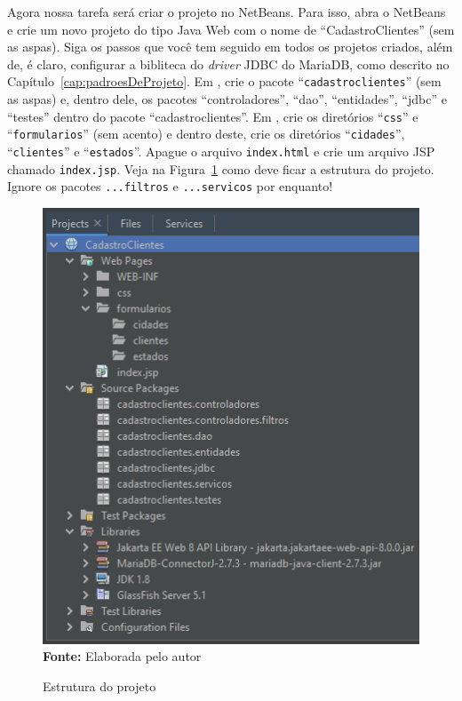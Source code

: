 Agora nossa tarefa será criar o projeto no NetBeans. Para isso, abra o NetBeans e crie um novo projeto do tipo Java Web com o nome de ``CadastroClientes'' (sem as aspas). Siga os passos que você tem seguido em todos os projetos criados, além de, é claro, configurar a bibliteca do \textit{driver} JDBC do MariaDB, como descrito no Capítulo~\ref{cap:padroesDeProjeto}. Em , crie o pacote ``\texttt{cadastroclientes}'' (sem as aspas) e, dentro dele, os pacotes ``controladores'', ``dao'', ``entidades'', ``jdbc'' e ``testes'' dentro do pacote ``cadastroclientes''. Em , crie os diretórios ``\texttt{css}'' e ``\texttt{formularios}'' (sem acento) e dentro deste, crie os diretórios ``\texttt{cidades}'', ``\texttt{clientes}'' e ``\texttt{estados}''. Apague o arquivo \texttt{index.html} e crie um arquivo JSP chamado \texttt{index.jsp}. Veja na Figura~\ref{fig:cap05EstruturaProjeto} como deve ficar a estrutura do projeto. Ignore os pacotes \texttt{...filtros} e \texttt{...servicos} por enquanto!

\FloatBarrier
\begin{figure}[!htbp]
    \centering
    \caption{Estrutura do projeto}
    \includegraphics[scale=0.7]{imagens/cap05EstruturaProjeto}
    \\\textbf{Fonte:} Elaborada pelo autor
    \label{fig:cap05EstruturaProjeto}
\end{figure}
\FloatBarrier

